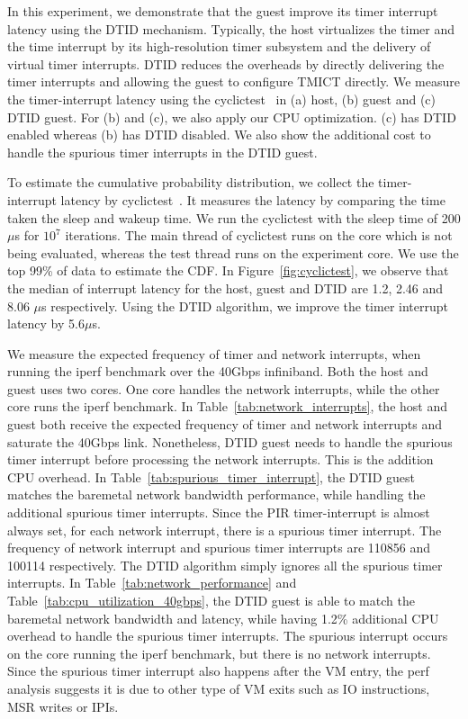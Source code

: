 In this experiment, we demonstrate that the guest improve its
timer interrupt latency using the DTID mechanism. Typically,
the host virtualizes the timer and the time interrupt by its
high-resolution timer subsystem and the delivery of virtual
timer interrupts. DTID reduces the overheads by directly
delivering the timer interrupts and allowing the guest to
configure TMICT directly. We measure the timer-interrupt
latency using the cyclictest~\cite{cyclictest} in (a) host,
(b) guest and (c) DTID guest. For (b) and (c), we also apply
our CPU optimization. (c) has DTID enabled whereas (b) has
DTID disabled. We also show the additional cost to handle the
spurious timer interrupts in the DTID guest.

To estimate the cumulative probability distribution, we
collect the timer-interrupt latency by
cyclictest~\cite{cyclictest}. It measures the latency by
comparing the time taken the sleep and wakeup time. We run the
cyclictest with the sleep time of 200$\mu$s for $10^7$
iterations. The main thread of cyclictest runs on the core
which is not being evaluated, whereas the test thread runs on
the experiment core. We use the top 99\% of data to estimate
the CDF. In Figure~\ref{fig:cyclictest}, we observe that the
median of interrupt latency for the host, guest and DTID are
1.2, 2.46 and 8.06 $\mu$s respectively. Using the DTID
algorithm, we improve the timer interrupt latency by
5.6$\mu$s.

We measure the expected frequency of timer and network
interrupts, when running the iperf benchmark over the 40Gbps
infiniband. Both the host and guest uses two cores. One core
handles the network interrupts, while the other core runs the
iperf benchmark. In Table~\ref{tab:network_interrupts}, the
host and guest both receive the expected frequency of timer
and network interrupts and saturate the 40Gbps link.
Nonetheless, DTID guest needs to handle the spurious timer
interrupt before processing the network interrupts. This is
the addition CPU overhead. In
Table~\ref{tab:spurious_timer_interrupt}, the DTID guest
matches the baremetal network bandwidth performance, while
handling the additional spurious timer interrupts. Since the
PIR timer-interrupt is almost always set, for each network
interrupt, there is a spurious timer interrupt.  The frequency
of network interrupt and spurious timer interrupts are 110856
and 100114 respectively. The DTID algorithm simply ignores all
the spurious timer interrupts. In
Table~\ref{tab:network_performance} and
Table~\ref{tab:cpu_utilization_40gbps}, the DTID guest is able
to match the baremetal network bandwidth and latency, while
having 1.2\% additional CPU overhead to handle the spurious
timer interrupts. The spurious interrupt occurs on the core
running the iperf benchmark, but there is no network
interrupts. Since the spurious timer interrupt also happens
after the VM entry, the perf analysis suggests it is due to
other type of VM exits such as IO instructions, MSR writes or
IPIs.

